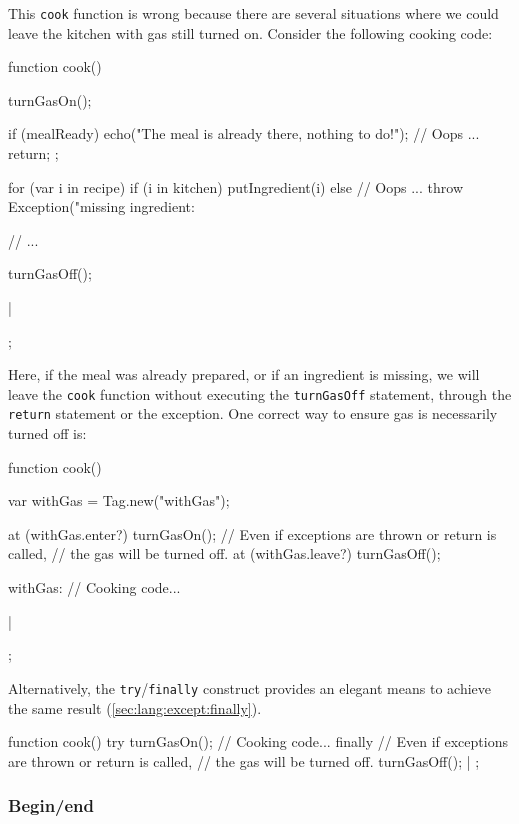 This \lstinline|cook| function is wrong because there are several situations
where we could leave the kitchen with gas still turned on. Consider the
following cooking code:

\begin{urbiscript}
{
  function cook()
  {
    turnGasOn();

    if (mealReady)
    {
      echo("The meal is already there, nothing to do!");
      // Oops ...
      return;
    };

    for (var i in recipe)
      if (i in kitchen)
        putIngredient(i)
      else
        // Oops ...
        throw Exception("missing ingredient: %

    // ...

    turnGasOff();
  }|
};
\end{urbiscript}

Here, if the meal was already prepared, or if an ingredient is missing, we
will leave the \lstinline|cook| function without executing the
\lstinline|turnGasOff| statement, through the \lstinline|return| statement
or the exception.  One correct way to ensure gas is necessarily turned off
is:

\begin{urbiscript}
{
  function cook()
  {
    var withGas = Tag.new("withGas");

    at (withGas.enter?)
      turnGasOn();
    // Even if exceptions are thrown or return is called,
    // the gas will be turned off.
    at (withGas.leave?)
      turnGasOff();

    withGas: {
      // Cooking code...
    }
  }|
};
\end{urbiscript}

Alternatively, the \lstinline|try|/\lstinline|finally| construct provides an
elegant means to achieve the same result (\autoref{sec:lang:except:finally}).

\begin{urbiscript}
{
  function cook()
  {
    try
    {
      turnGasOn();
      // Cooking code...
    }
    finally
    {
      // Even if exceptions are thrown or return is called,
      // the gas will be turned off.
      turnGasOff();
    }
  }|
};
\end{urbiscript}

\subsubsection{Begin/end}
\label{sec:specs:tag:begin-end}

